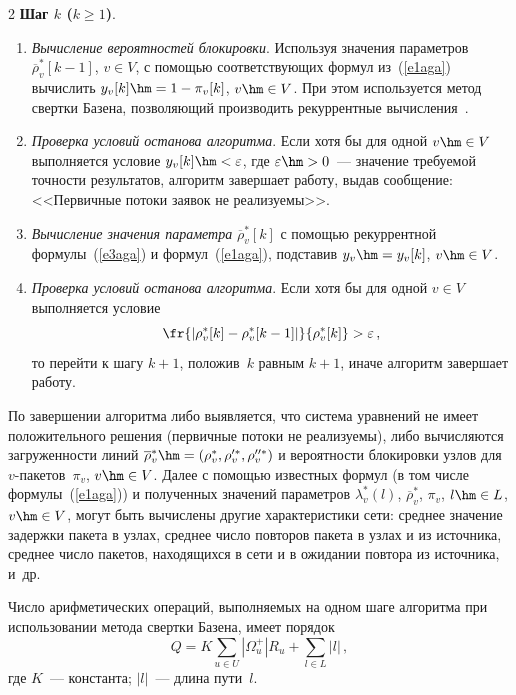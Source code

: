 \begin{multicols}{2}
     \textbf{Шаг $k$ ($k\geq 1$)}.
     \begin{enumerate}[1.]
\item \textit{Вычисление вероятностей блокировки}. Используя значения 
параметров $\overline{\rho}_v^*[k-1]$, $v\in V$, с\linebreak
помощью 
соответствующих формул из~(\ref{e1aga}) вы\-чис\-лить $y_v[k]\hm=1-\pi_v[k]$, 
$v\hm\in V$. При этом используется метод свертки Базена, позволяющий 
производить рекуррентные вычисления~\cite{3aga}.
\item \textit{Проверка условий останова алгоритма}. Если хотя бы для одной 
$v\hm\in V$ выполняется условие $y_v[k]\hm <\varepsilon$, где 
$\varepsilon\hm >0$~--- значение требуемой точности результатов, алгоритм 
завершает работу, выдав сообщение: <<Первичные потоки заявок не 
реализуемы>>. 
\item \textit{Вычисление значения параметра} 
$\overline{\rho}_v^*[k]$ с по\-мощью рекуррентной формулы~(\ref{e3aga}) и 
формул~(\ref{e1aga}), подставив $y_v\hm=y_v[k]$, $v\hm\in V$.
\item \textit{Проверка условий останова алгоритма}. Если хотя бы для одной 
$v\in V$ выполняется условие
$$
\fr{\left\vert \rho^*_v[k]-\rho^*_v[k-1]\right\vert}{\rho_v^*[k]}>\varepsilon\,,
$$
то перейти к шагу $k+1$, положив~$k$ равным $k+1$, иначе алгоритм 
завершает работу.
     \end{enumerate}
     
     По завершении алгоритма либо выявляется, что система уравнений не 
имеет положительного решения (первичные потоки не реализуемы), либо 
вычисляются загруженности линий $\overline{\rho}_v^*\hm=\left(\rho^*_v, 
\rho_v^{\prime *}, \rho_v^{\prime\prime *}\right)$ и вероятности блокировки узлов 
для $v$-пакетов~$\pi_v$, $v\hm\in V$. Далее с помощью известных формул 
(в том числе формулы~(\ref{e1aga})) и полученных значений параметров 
$\lambda^*_v(l)$, $\overline{\rho}_v^*$, $\pi_v$, $l\hm\in L$, $v\hm\in V$, 
могут быть вычислены другие характеристики сети: среднее значение 
задержки пакета в узлах, среднее число повторов пакета в узлах и из 
источника, среднее число пакетов, находящихся в сети и в ожидании повтора 
из источника, и~др. 

\columnbreak
   
   Число арифметических операций, выпол\-ня\-емых на одном шаге алгоритма 
при использовании метода свертки Базена, имеет порядок
   $$
   Q=K\sum\limits_{u\in U}\left\vert \Omega_u^+\right\vert 
R_u+\sum\limits_{l\in L}\left\vert l\right\vert\,,
   $$
где $K$~--- константа; $\vert l\vert$~--- длина пути~$l$.
     

\end{multicols}

